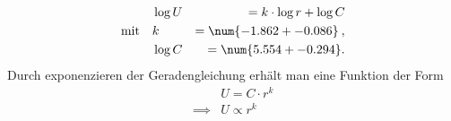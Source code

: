 \begin{align*}
    &\log{U} &= k \cdot \log{r} + \log{C} \\
    \text{mit} \quad &k &= \num{-1.862 +- 0.086} \:, \\
    &\log{C} &= \num{5.554 +- 0.294} .
\end{align*}
Durch exponenzieren der Geradengleichung erhält man eine Funktion der Form
\begin{align*}
    &U = C \cdot r^k \\
    \implies &U \propto r^k
\end{align*}